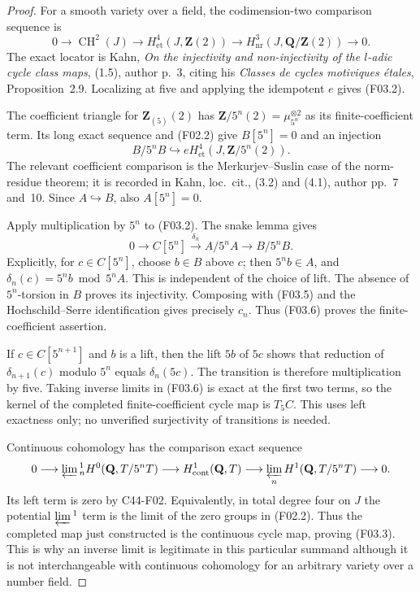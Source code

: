 \begin{proof}
For a smooth variety over a field, the codimension-two
comparison sequence is
\[
 0\longrightarrow\operatorname{CH}^2(J)
 \longrightarrow H^4_{\mathrm{et}}(J,\mathbf Z(2))
 \longrightarrow H^3_{\mathrm{nr}}(J,\mathbf Q/\mathbf Z(2))
 \longrightarrow0.
\]
The exact locator is Kahn, \emph{On the injectivity and
non-injectivity of the $l$-adic cycle class maps}, (1.5),
author p.~3, citing his \emph{Classes de cycles motiviques
\'etales}, Proposition~2.9.  Localizing at five and applying
the idempotent $e$ gives (F03.2).

The coefficient triangle for $\mathbf Z_{(5)}(2)$ has
$\mathbf Z/5^n(2)=\mu_{5^n}^{\otimes2}$ as its finite-coefficient
term.  Its long exact sequence and (F02.2) give
$B[5^n]=0$ and an injection
\[
 B/5^nB\hookrightarrow
       eH^4_{\mathrm{et}}(J,\mathbf Z/5^n(2)).     \tag{F03.5}
\]
The relevant coefficient comparison is the Merkurjev--Suslin
case of the norm-residue theorem; it is recorded in Kahn,
loc.~cit., (3.2) and (4.1), author pp.~7 and~10.
Since $A\hookrightarrow B$, also $A[5^n]=0$.

Apply multiplication by $5^n$ to (F03.2).  The snake lemma gives
\[
 0\longrightarrow C[5^n]\xrightarrow{\delta_n}A/5^nA
 \longrightarrow B/5^nB.
 \tag{F03.6}
\]
Explicitly, for $c\in C[5^n]$, choose $b\in B$ above $c$;
then $5^n b\in A$, and
$\delta_n(c)=5^n b\bmod5^nA$.  This is independent of the
choice of lift.  The absence of $5^n$-torsion in $B$ proves
its injectivity.  Composing with (F03.5) and the
Hochschild--Serre identification gives precisely $c_n$.
Thus (F03.6) proves the finite-coefficient assertion.

If $c\in C[5^{n+1}]$ and $b$ is a lift, then the lift $5b$
of $5c$ shows that reduction of $\delta_{n+1}(c)$ modulo $5^n$
equals $\delta_n(5c)$.  The transition is therefore multiplication
by five.  Taking inverse limits in (F03.6) is exact at the first
two terms, so the kernel of the completed finite-coefficient
cycle map is $T_5C$.  This uses left exactness only; no
unverified surjectivity of transitions is needed.

Continuous cohomology has the comparison exact sequence
\[
 0\longrightarrow\varprojlim{}^1_n
       H^0(\mathbf Q,T/5^nT)
 \longrightarrow H^1_{\mathrm{cont}}(\mathbf Q,T)
 \longrightarrow\varprojlim_n H^1(\mathbf Q,T/5^nT)
 \longrightarrow0.
\]
Its left term is zero by C44-F02.  Equivalently, in total
degree four on $J$ the potential $\varprojlim{}^1$ term is the
limit of the zero groups in (F02.2).  Thus the completed map
just constructed is the continuous cycle map, proving (F03.3).
This is why an inverse limit is legitimate in this particular
summand although it is not interchangeable with continuous
cohomology for an arbitrary variety over a number field.


\end{proof}
